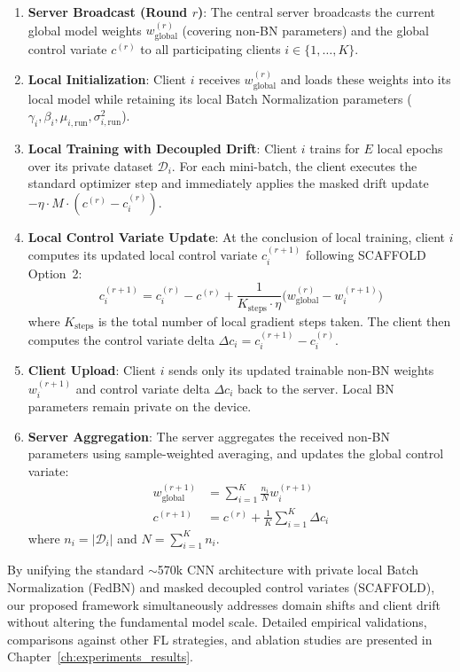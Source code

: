 \begin{enumerate}
    \item \textbf{Server Broadcast (Round $r$)}:
    The central server broadcasts the current global model weights $w_{\text{global}}^{(r)}$ (covering non-BN parameters) and the global control variate $c^{(r)}$ to all participating clients $i \in \{1, \dots, K\}$.

    \item \textbf{Local Initialization}:
    Client $i$ receives $w_{\text{global}}^{(r)}$ and loads these weights into its local model while retaining its local Batch Normalization parameters ($\gamma_i, \beta_i, \mu_{i, \text{run}}, \sigma_{i, \text{run}}^2$).

    \item \textbf{Local Training with Decoupled Drift}:
    Client $i$ trains for $E$ local epochs over its private dataset $\mathcal{D}_i$. For each mini-batch, the client executes the standard optimizer step and immediately applies the masked drift update $- \eta \cdot M \cdot (c^{(r)} - c_i^{(r)})$.

    \item \textbf{Local Control Variate Update}:
    At the conclusion of local training, client $i$ computes its updated local control variate $c_i^{(r+1)}$ following SCAFFOLD Option~2:
    \begin{equation}
        c_i^{(r+1)} = c_i^{(r)} - c^{(r)} + \frac{1}{K_{\text{steps}} \cdot \eta} \big(w_{\text{global}}^{(r)} - w_i^{(r+1)}\big)
        \label{eq:client_c_update}
    \end{equation}
    where $K_{\text{steps}}$ is the total number of local gradient steps taken. The client then computes the control variate delta $\Delta c_i = c_i^{(r+1)} - c_i^{(r)}$.

    \item \textbf{Client Upload}:
    Client $i$ sends only its updated trainable non-BN weights $w_i^{(r+1)}$ and control variate delta $\Delta c_i$ back to the server. Local BN parameters remain private on the device.

    \item \textbf{Server Aggregation}:
    The server aggregates the received non-BN parameters using sample-weighted averaging, and updates the global control variate:
    \begin{align}
        w_{\text{global}}^{(r+1)} &= \sum_{i=1}^K \frac{n_i}{N} w_i^{(r+1)} \label{eq:server_agg_w} \\
        c^{(r+1)} &= c^{(r)} + \frac{1}{K} \sum_{i=1}^K \Delta c_i \label{eq:server_agg_c}
    \end{align}
    where $n_i = |\mathcal{D}_i|$ and $N = \sum_{i=1}^K n_i$.
\end{enumerate}

By unifying the standard $\sim$570k CNN architecture with private local Batch Normalization (FedBN) and masked decoupled control variates (SCAFFOLD), our proposed framework simultaneously addresses domain shifts and client drift without altering the fundamental model scale. Detailed empirical validations, comparisons against other FL strategies, and ablation studies are presented in Chapter~\ref{ch:experiments_results}.
